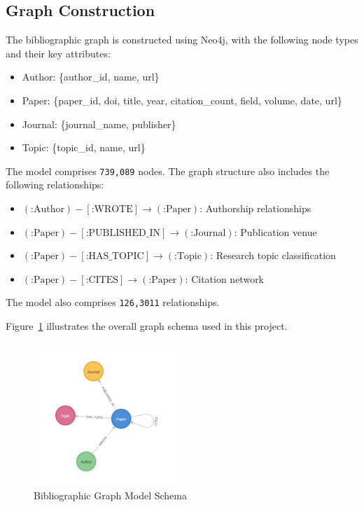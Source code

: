 \documentclass[conference]{IEEEtran}
\begin{document}
\subsection{Graph Construction}
\noindent The bibliographic graph is constructed using Neo4j, with the following node types and their key attributes:

\begin{itemize}
    \item Author: \{author\_id, name, url\}
    \item Paper: \{paper\_id, doi, title, year, citation\_count, field, volume, date, url\}
    \item Journal: \{journal\_name, publisher\}
    \item Topic: \{topic\_id, name, url\}
\end{itemize}
The model comprises \texttt{739,089} nodes.
\noindent The graph structure also includes the following relationships:
\begin{itemize}
    \item $(\text{:Author})-[\text{:WROTE}] \xrightarrow{} (\text{:Paper})$: Authorship relationships
    \item $(\text{:Paper})-[\text{:PUBLISHED\_IN}] \xrightarrow{} (\text{:Journal})$: Publication venue
    \item $(\text{:Paper})-[\text{:HAS\_TOPIC}] \xrightarrow{} (\text{:Topic})$: Research topic classification
    \item $(\text{:Paper})-[\text{:CITES}] \xrightarrow{} (\text{:Paper})$: Citation network
\end{itemize}
The model also comprises \texttt{126,3011} relationships.

\noindent Figure~\ref{fig:graphmodel} illustrates the overall graph schema used in this project.

\begin{figure}[ht]
    \centering
    \includegraphics[width=0.48\textwidth]{Untitled design.png}
    \caption{Bibliographic Graph Model Schema}
    \label{fig:graphmodel}
\end{figure}
\end{document}
